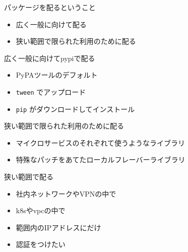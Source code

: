 \documentclass[presentation]{beamer}
\begin{document}
\begin{frame}[label={sec:orgf3f5b2c}]{パッケージを配るということ}
\begin{itemize}
\item 広く一般に向けて配る
\item 狭い範囲で限られた利用のために配る
\end{itemize}
\end{frame}

\begin{frame}[label={sec:orgc3e8cd1},fragile]{広く一般に向けてpypiで配る}
 \begin{itemize}
\item PyPAツールのデフォルト
\item \texttt{tween} でアップロード
\item \texttt{pip} がダウンロードしてインストール
\end{itemize}
\end{frame}

\begin{frame}[label={sec:org3c4ede4}]{狭い範囲で限られた利用のために配る}
\begin{itemize}
\item マイクロサービスのそれぞれて使うようなライブラリ
\item 特殊なパッチをあてたローカルフレーバーライブラリ
\end{itemize}
\end{frame}

\begin{frame}[label={sec:org897a986}]{狭い範囲で配る}
\begin{itemize}
\item 社内ネットワークやVPNの中で
\item k8sやvpcの中で
\item 範囲内のIPアドレスにだけ
\item 認証をつけたい
\end{itemize}
\end{frame}
\end{document}
